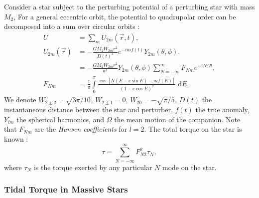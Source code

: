 \documentclass[
        fleqn,
        usenatbib,
        referee,
    ]{mnras}
\newcommand*{\p}[1]{\left(#1\right)}
\newcommand*{\s}[1]{\left[#1\right]}
\begin{document}
Consider a star subject to the perturbing potential of a perturbing star with
mass $M_2$, For a general eccentric orbit, the potential to quadrupolar order
can be decomposed into a sum over circular orbits \citep{sl,vlf}:
\begin{align}
    U &= \sum\limits_m U_{2m} \p{\vec{r}, t},\label{eq:u_ecc}\\
    U_{2m}\p{\vec{r}} &= -\frac{GM_2 W_{2m} r^2}{D(t)^3}
            e^{-imf(t)} Y_{2m}(\theta, \phi),\nonumber\\
        &= -\frac{GM_2W_{2m}r^2}{a^3}Y_{2m}\p{\theta, \phi}
            \sum\limits_{N = -\infty}^\infty F_{Nm}e^{-iN\Omega t},\\
    F_{Nm} &= \frac{1}{\pi}\int\limits_{0}^{\pi}
        \frac{\cos\s{N\p{E - e\sin E} - mf(E)}}
            {\p{1 - e\cos E}^2}\;\mathrm{d}E.
\end{align}
We denote $W_{2 \pm 2} = \sqrt{3\pi/10}$, $W_{2 \pm 1} = 0$, $W_{20} =
-\sqrt{\pi / 5}$, $D(t)$ the instantaneous distance between the star and
perturber, $f(t)$ the true anomaly, $Y_{lm}$ the spherical harmonics, and
$\Omega$ the mean motion of the companion. Note that $F_{Nm}$ are the
\emph{Hansen coefficients} for $l = 2$. The total torque on the star is known
\citep{vlf}:
\begin{equation}
    \tau = \sum\limits_{N = -\infty}^\infty F_{N2}^2 \tau_N,\label{eq:tau_each}
\end{equation}
where $\tau_N$ is the torque exerted by any particular $N$ mode on the star.

\subsubsection{Tidal Torque in Massive Stars}
\end{document}
